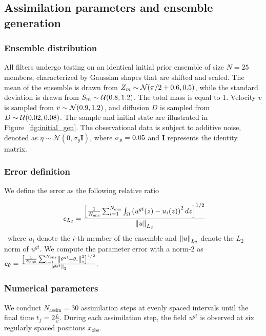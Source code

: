 \subsection{Assimilation parameters and ensemble generation}

\subsubsection{Ensemble distribution}
All filters undergo testing on an identical initial prior ensemble of size $N = 25$ members, characterized by Gaussian shapes that are shifted and scaled. The mean of the ensemble is drawn from $Z_m \sim \mathcal{N}(\pi/2 + 0.6, 0.5)$, while the standard deviation is drawn from $S_m \sim \mathcal{U}(0.8, 1.2)$. The total mass is equal to 1.
Velocity $v$ is sampled from $v \sim \mathcal{N}(0.9, 1.2)$, and diffusion $D$ is sampled from $D \sim \mathcal{U}(0.02, 0.08)$. The sample and initial state are illustrated in Figure~\ref{fig:initial_gen}.
The observational data is subject to additive noise, denoted as $\eta \sim \mathcal{N}(0, \sigma_y \bm{I})$, where $\sigma_y = 0.05$ and $\bm{I}$ represents the identity matrix.

\subsubsection{Error definition}
We define the error as the following relative ratio

\begin{equation}~\label{eq:L2_error}
	e_{L_2} =\frac{ \left[\frac1{N_{\text{ens}}} \sum_{i = 1}^{N_{\text{ens}}} \int_\Omega \left(u^{gt}(z) - u_i(z)\right)^2 dz\right]^{1/2}}{\left\lVert u \right\rVert_{L_2}}
\end{equation}~where $u_i$ denote the $i$-th member of the ensemble and $\left\lVert u \right\rVert_{L_2}$ denote the $L_2$ norm of $u^{gt}$. We compute the parameter error with a norm-2 as $e_{\theta} = \frac{ \left[\frac1{N_{\text{ens}}} \sum_{i = 1}^{N_{\text{ens}}} \left\lVert \theta^{gt} - \theta_{i} \right\rVert_2^2\right]^{1/2}}{\left\lVert \theta^{gt} \right\rVert_2}$.


\subsubsection{Numerical parameters}

We conduct $N_{\text{assim}} = 30$ assimilation steps at evenly spaced intervals until the final time $t_f = 2 \frac{L}{v}$. During each assimilation step, the field $u^{gt}$ is observed at six regularly spaced positions $x_{\text{obs}}$.


